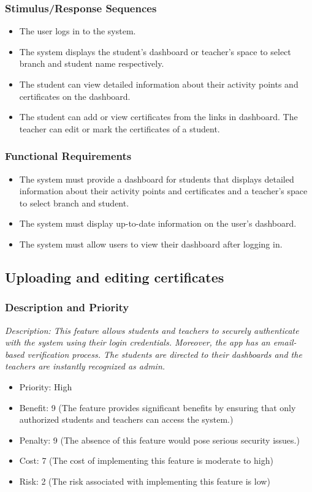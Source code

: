 \documentclass{article}
\begin{document}
\subsubsection{Stimulus/Response Sequences}
\begin{itemize}
  \item The user logs in to the system.
  \item The system displays the student’s dashboard or teacher's space to select branch and student name respectively.
  \item The student can view detailed information about their activity points and certificates on the dashboard.
  \item The student can add or view certificates from the links in dashboard. The teacher can edit or mark the certificates of a student.
\end{itemize}

\subsubsection{Functional Requirements}
\begin{itemize}
\item The system must provide a dashboard for students that displays detailed information about their activity points and certificates and a teacher's space to select branch and student.
\item The system must display up-to-date information on the user’s dashboard.
\item The system must allow users to view their dashboard after logging in.
\end{itemize}




\subsection{Uploading and editing certificates}
\subsubsection{Description and Priority}
\emph{Description: This feature allows students and teachers to securely authenticate with the system using their login credentials. Moreover, the app has an email-based verification process. The students are directed to their dashboards and the teachers are instantly recognized as admin.}
\begin{itemize}
  \item Priority: High
  \item Benefit: 9 (The feature provides significant benefits by ensuring that only authorized students and teachers can access the system.)
  \item Penalty: 9 (The absence of this feature would pose serious security issues.)
  \item Cost: 7 (The cost of implementing this feature is moderate to high)
  \item Risk: 2 (The risk associated with implementing this feature is low)
\end{itemize}
\end{document}
